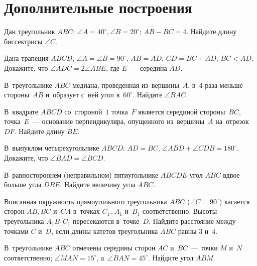 

\section*{Дополнительные построения}


\begin{problems}

\item
Дан треугольник $ABC$;
$\angle A = 40^{\circ}, \angle B = 20^{\circ}$;
$AB - BC = 4$.
Найдите длину биссектрисы $\angle C$.

\item
Дана трапеция $ABCD$, $\angle A = \angle B = 90^{\circ}$,
$AB = AD$, $CD = BC + AD$, $BC < AD$.
Докажите, что $\angle ADC = 2 \angle ABE$, где $E$~--- середина $AD$.

\item
В~треугольнике $ABC$ медиана, проведенная из~вершины~$A$, в~$4$ раза меньше
стороны~$AB$ и~образует с~ней угол в~$60^{\circ}$.
Найдите $\angle BAC$.

\item
В~квадрате $ABCD$ со~стороной~$1$ точка~$F$ является серединой стороны~$BC$,
точка~$E$~--- основание перпендикуляра, опущенного из~вершины~$A$
на~отрезок~$DF$.
Найдите длину $BE$.

\item
В~выпуклом четырехугольнике $ABCD$:
$AD = BC$, $\angle ABD + \angle CDB = 180^{\circ}$.
Докажите, что $\angle BAD = \angle BCD$.

\item
В~равностороннем (неправильном) пятиугольнике $ABCDE$ угол $ABC$ вдвое больше
угла $DBE$.
Найдите величину угла $ABC$.

\item
Вписанная окружность прямоугольного треугольника $ABC$
($\angle C = 90^{\circ}$) касается сторон $AB, BC$ и~$CA$
в~точках $C_1$, $A_1$ и~$B_1$ соответственно.
Высоты треугольника $A_1 B_1 C_1$ пересекаются в~точке~$D$.
Найдите расстояние между точками $C$ и~$D$, если длины катетов треугольника
$ABC$ равны $3$ и~$4$.

\item
В~треугольнике $ABC$ отмечены середины сторон $AC$ и~$BC$~--- точки $M$ и~$N$
соответственно;
$\angle MAN = 15^{\circ}$, а~$\angle BAN = 45^{\circ}$.
Найдите угол $ABM$.

\end{problems}

